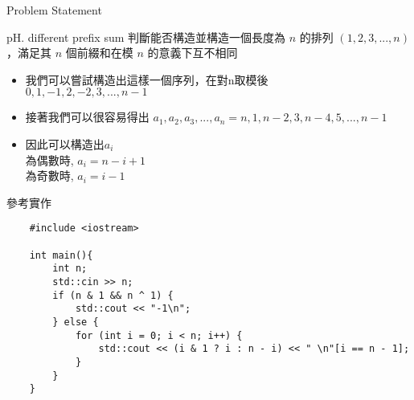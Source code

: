 \documentclass[notheorems,xcolor=dvipsnames]{beamer}
\theoremstyle{definition}
\begin{document}
\begin{frame}[fragile]{\LARGE Problem Statement}
  \begin{block}{pH. different prefix sum}
    判斷能否構造並構造一個長度為 $n$ 的排列 $(1, 2, 3, ... , n)$，滿足其 $n$ 個前綴和在模 $n$ 的意義下互不相同
  \end{block} 
  \begin{itemize}
    \item <1-> 我們可以嘗試構造出這樣一個序列，在對n取模後 \\
    $0, 1, -1, 2, -2, 3, ... , n - 1$
    \vspace{0.3cm}
    \item <2-> 接著我們可以很容易得出
    $a_1, a_2, a_3, ... ,a_n = n, 1, n-2, 3, n-4, 5, ... , n-1$
    \vspace{0.3cm}
    \item <3->
    因此可以構造出$a_i$ \\
    為偶數時, $a_i = n - i + 1$ \\
    為奇數時, $a_i = i - 1$ 
  \end{itemize}
\end{frame}


\begin{frame}[fragile]{參考實作}
  \begin{verbatim}
    #include <iostream>

    int main(){
        int n;
        std::cin >> n;
        if (n & 1 && n ^ 1) {
            std::cout << "-1\n";
        } else {
            for (int i = 0; i < n; i++) {
                std::cout << (i & 1 ? i : n - i) << " \n"[i == n - 1];
            }
        }
    }
  \end{verbatim}
\end{frame}

%

\end{document}
